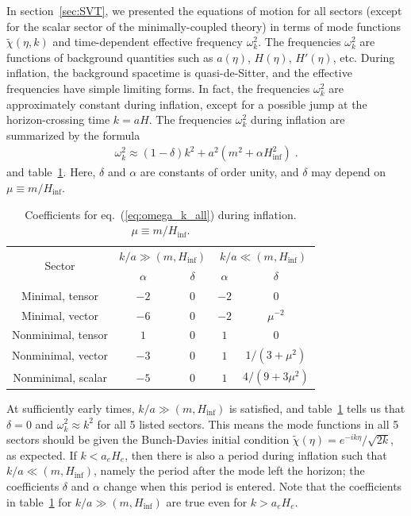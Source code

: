 \documentclass[11pt,a4paper]{article}
\newcommand{\tref}[1]{table~\ref{#1}}
\newcommand{\sref}[1]{section~\ref{#1}}
\newcommand{\eref}[1]{eq.~(\ref{#1})}
\begin{document}
\begin{appendix}
In \sref{sec:SVT}, we presented the equations of motion for all sectors (except for the scalar sector of the minimally-coupled theory) in terms of mode functions $\tilde{\chi}(\eta,k)$ and time-dependent effective frequency $\omega_k^2$.  The frequencies $\omega_k^2$ are functions of background quantities such as $a(\eta)$, $H(\eta)$, $H'(\eta)$, etc.  During inflation, the background spacetime is quasi-de-Sitter, and the effective frequencies have simple limiting forms.  In fact, the frequencies $\omega_k^2$ are approximately constant during inflation, except for a possible jump at the horizon-crossing time $k = a H$.  The frequencies $\omega_k^2$ during inflation are summarized by the formula
\begin{align}
  \omega_k^2 \approx (1 - \delta) k^2 + a^2 (m^2 + \alpha H_{\mathrm{inf}}^2)
  \;.
  \label{eq:omega_k_all}
\end{align}
and \tref{tab:omega_k_coeffs}.  Here, $\delta$ and $\alpha$ are constants of order unity, and $\delta$ may depend on $\mu \equiv m / H_{\mathrm{inf}}$.
\begin{table}[ht]
\centering
\caption{Coefficients for \eref{eq:omega_k_all} during inflation. $\mu \equiv m / H_\mathrm{inf}$.}
\begin{tabular}{| c | c c | c c |}
    \hline
    \multirow{2}{*}{Sector}  
    & \multicolumn{2}{c|}{$k/a \gg (m, H_\mathrm{inf})$}  
    & \multicolumn{2}{c|}{$k/a \ll (m, H_\mathrm{inf})$}  \\
    & \(\alpha\) & \(\delta\) & \(\alpha\) & \(\delta\)    \\
    \hline
    Minimal, tensor     & \(-2\)     & \(0\)  & \(-2\)     & \(0\)                   \\
    Minimal, vector     & \(-6\)     & \(0\) & \(-2\)     & \(\mu^{-2}\)               \\
    Nonminimal, tensor & \(1\)      & \(0\) & \(1\)      & \(0\)                   \\
    Nonminimal, vector & \(-3\)      & \(0\) & \(1\)      & \(1/(3 + \mu^2)\) \\
    Nonminimal, scalar & \(-5\)      & \(0\) & \(1\)      & \(4/(9 + 3 \mu^2)\)   \\
    \hline
  \end{tabular}
  \label{tab:omega_k_coeffs}
\end{table}

At sufficiently early times, $k / a \gg (m, H_\mathrm{inf})$ is satisfied, and \tref{tab:omega_k_coeffs} tells us that $\delta = 0$ and $\omega_k^2 \approx k^2$ for all 5 listed sectors.  This means the mode functions in all 5 sectors should be given the Bunch-Davies initial condition $\tilde{\chi}(\eta) = e^{-i k \eta} / \sqrt{2k}$, as expected.  If $k < a_e H_e$, then there is also a period during inflation such that $k / a \ll (m, H_\mathrm{inf})$, namely the period after the mode left the horizon; the coefficients $\delta$ and $\alpha$ change when this period is entered.  Note that the coefficients in \tref{tab:omega_k_coeffs} for $k / a \gg (m, H_\mathrm{inf})$ are true even for $k > a_e H_e$.


\end{appendix}
\end{document}
